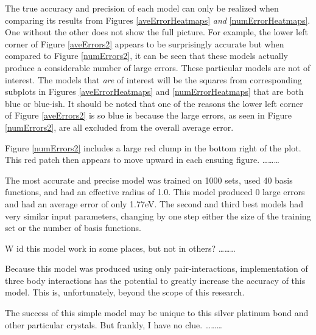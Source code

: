 \par The true accuracy and precision of each model can only be realized when comparing its results from Figures \ref{aveErrorHeatmaps} \textit{and} \ref{numErrorHeatmaps}. One without the other does not show the full picture. For example, the lower left corner of Figure \ref{aveErrors2} appears to be surprisingly accurate but when compared to Figure \ref{numErrors2}, it can be seen that these models actually produce a considerable number of large errors. These particular models are not of interest. The models that \textit{are} of interest will be the squares from corresponding subplots in Figures \ref{aveErrorHeatmaps} and \ref{numErrorHeatmaps} that are both blue or blue-ish. It should be noted that one of the reasons the lower left corner of Figure \ref{aveErrors2} is so blue is because the large errors, as seen in Figure \ref{numErrors2}, are all excluded from the overall average error.
\par Figure \ref{numErrors2} includes a large red clump in the bottom right of the plot. This red patch then appears to move upward in each ensuing figure. \ldots \ldots \ldots
\par The most accurate and precise model was trained on 1000 sets, used 40 basis functions, and had an effective radius of 1.0. This model produced 0 large errors and had an average error of only 1.77eV. The second and third best models had very similar input parameters, changing by one step either the size of the training set or the number of basis functions.
\par W id this model work in some places, but not in others? \ldots \ldots \ldots
\par Because this model was produced using only pair-interactions, implementation of three body interactions has the potential to greatly increase the accuracy of this model. This is, unfortunately, beyond the scope of this research.
\par The success of this simple model may be unique to this silver platinum bond and other particular crystals. But frankly, I have no clue. \ldots\ldots\ldots





